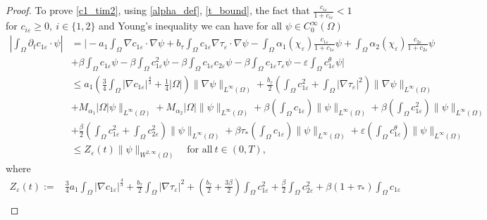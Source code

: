 \documentclass[10pt,a4paper]{amsart}
\begin{document}
\begin{proof}
  \noindent
  To prove \eqref{c1_tim2}, using \eqref{alpha_def}, \eqref{t_bound}, the fact that $\frac{c_{i\varepsilon}}{1 + c_{i\varepsilon}} < 1$ for $c_{i\varepsilon} \geq 0,\ i \in \{1, 2\}$ and Young's inequality we can have for all $\psi \in C_0^\infty(\Omega)$
  \begin{align}
  \label{c1_tim5}
    \nonumber \left|\int_\Omega \partial_t c_{1\varepsilon} \cdot \psi\right| & = \bigg| - a_1 \int_\Omega \nabla c_{1\varepsilon} \cdot \nabla \psi + b_\tau \int_\Omega c_{1\varepsilon} \nabla \tau_\varepsilon \cdot \nabla \psi  - \int_\Omega \alpha_1(\chi_\varepsilon)\tfrac{c_{1\varepsilon}}{1 + c_{1\varepsilon}}  \psi + \int_\Omega \alpha_2( \chi_\varepsilon) \tfrac{c_{2\varepsilon}}{1 + c_{2\varepsilon}} \psi \\[5pt]
    \nonumber &   + \beta \int_\Omega  c_{1\varepsilon}\psi -  \beta \int_\Omega  c_{1\varepsilon}^2\psi - \beta \int_\Omega  c_{1\varepsilon}   c_{2\varepsilon}\psi  - \beta \int_\Omega  c_{1\varepsilon} \tau_\varepsilon\psi  - \varepsilon \int_\Omega  c_{1\varepsilon}^\theta \psi \bigg|\\[5pt]
    \nonumber & \leq a_1 \left(\frac{3}{4} \int_\Omega |\nabla c_{1\varepsilon}|^{\frac{4}{3}} + \frac{1}{4} |\Omega|\right)\|\nabla \psi\|_{L^\infty(\Omega)} + \frac{b_\tau}{2} \left(\int_\Omega c_{1\varepsilon}^2 + \int_\Omega |\nabla \tau_\varepsilon|^2\right)\|\nabla \psi\|_{L^\infty(\Omega)} \\[5pt]
    \nonumber & + M_{\alpha_1} |\Omega| \psi\|_{L^\infty(\Omega)} +  M_{\alpha_2} |\Omega| \| \psi\|_{L^\infty(\Omega)}  + \beta \left(\int_\Omega c_{1\varepsilon}\right)\| \psi\|_{L^\infty(\Omega)}+ \beta \left(\int_\Omega c_{1\varepsilon}^2\right)\| \psi\|_{L^\infty(\Omega)} \\[5pt]
    \nonumber &   + \frac{\beta}{2} \left(\int_\Omega c_{1\varepsilon}^2 + \int_\Omega c_{2\varepsilon}^2\right)\| \psi\|_{L^\infty(\Omega)} + \beta \tau_\ast \left(\int_\Omega c_{1\varepsilon}\right)\| \psi\|_{L^\infty(\Omega)} + \varepsilon \left(\int_\Omega c_{1\varepsilon}^\theta\right)\| \psi\|_{L^\infty(\Omega)} \\[5pt]
    & \leq Z_\varepsilon(t) \|\psi\|_{W^{2, \infty}(\Omega)} \quad \text{for all} ~ t \in (0, T),
  \end{align}
  where
  \begin{align*}
    Z_\varepsilon(t) := & \frac{3}{4} a_1 \int_\Omega |\nabla c_{1\varepsilon}|^{\frac{4}{3}} + \frac{b_\tau}{2} \int_\Omega |\nabla \tau_\varepsilon|^{2} + \left(\frac{b_\tau}{2} + \frac{3\beta}{2}\right) \int_\Omega c_{1\varepsilon}^2 + \frac{\beta}{2} \int_\Omega c_{2\varepsilon}^2  + \beta(1 + \tau_\ast) \int_\Omega c_{1\varepsilon} \\[5pt]

\end{align*}
\end{proof}
\end{document}
